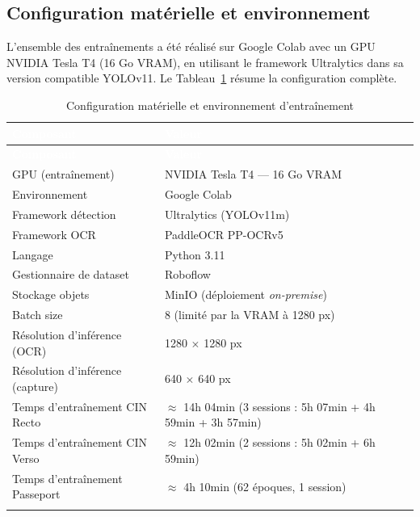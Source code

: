 \subsection{Configuration matérielle et environnement}
\label{subsec:config-materielle}

L'ensemble des entraînements a été réalisé sur Google Colab  avec un GPU NVIDIA Tesla T4 (16 Go VRAM), en utilisant le framework Ultralytics dans sa version compatible YOLOv11. Le Tableau~\ref{tab:ch3-config-materielle} résume la configuration complète.

\small
\begin{longtable}{|l|l|}
  \rowcolor{bleu_principal}
  \textcolor{white}{\textbf{Composant}} & \textcolor{white}{\textbf{Valeur}} \\
  \endfirsthead
  \rowcolor{bleu_principal}
  \textcolor{white}{\textbf{Composant}} & \textcolor{white}{\textbf{Valeur}} \\
  \endhead
  \midrule
  GPU (entraînement) & NVIDIA Tesla T4 --- 16 Go VRAM \\
  \midrule
  \rowcolor{gris_leger}
  Environnement & Google Colab  \\
  \midrule
  Framework détection & Ultralytics (YOLOv11m) \\
  \midrule
  \rowcolor{gris_leger}
  Framework OCR & PaddleOCR PP-OCRv5 \\
  \midrule
  Langage & Python 3.11 \\
  \midrule
  \rowcolor{gris_leger}
  Gestionnaire de dataset & Roboflow \\
  \midrule
  Stockage objets & MinIO (déploiement \textit{on-premise}) \\
  \midrule
  \rowcolor{gris_leger}
  Batch size & 8 (limité par la VRAM à 1280 px) \\
  \midrule
  Résolution d'inférence (OCR) & 1280 $\times$ 1280 px \\
  \midrule
  \rowcolor{gris_leger}
  Résolution d'inférence (capture) & 640 $\times$ 640 px \\
  \midrule
  Temps d'entraînement CIN Recto & $\approx$ 14h 04min (3 sessions : 5h 07min + 4h 59min + 3h 57min) \\
  \midrule
  \rowcolor{gris_leger}
  Temps d'entraînement CIN Verso & $\approx$ 12h 02min (2 sessions : 5h 02min + 6h 59min) \\
  \midrule
  Temps d'entraînement Passeport & $\approx$ 4h 10min (62 époques, 1 session) \\
  \bottomrule
  \caption{Configuration matérielle et environnement d'entraînement}
  \label{tab:ch3-config-materielle}
\end{longtable}
\normalsize



